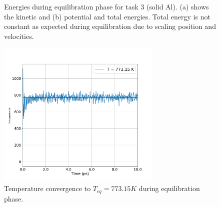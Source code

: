 \begin{figure}[!htbp]
\begin{subfigure}[b]{0.5\textwidth}
		\caption{}
	\end{subfigure}
	\caption{Energies during equilibration phase for task 3 (solid Al). (a) shows the kinetic and (b) potential and total energies. Total energy is not constant as expected during equilibration due to scaling position and velocities.}
	\label{fig3-1}
\end{figure}

\begin{figure}[!htbp]
	\begin{center}
		\includegraphics[width=0.7\textwidth]{figs/task3-temp.png} 
		\caption{Temperature convergence to $T_{eq} = 773.15K$ during equilibration phase.}
		\label{fig3-2}
	\end{center}
\end{figure}

